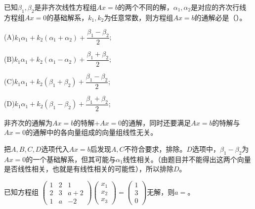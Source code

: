\documentclass[a4paper]{report}
\begin{document}
\EX 已知$\beta_1,\beta_2$是非齐次线性方程组$Ax=b$的两个不同的解，$\alpha_1,\alpha_2$是对应的齐次行线方程组$Ax=0$的基础解系，$k_1,k_2$为任意常数，则方程组$Ax=b$的通解必是（\hphantom{~~~~~~~~~~~~~}）。

(A)$k_1\alpha_1+k_2(\alpha_1+\alpha_2)+\dfrac{\beta_1-\beta_2}{2}$;

(B)$k_1\alpha_1+k_2(\alpha_1-\alpha_2)+\dfrac{\beta_1+\beta_2}{2}$;

(C)$k_1\alpha_1+k_2(\beta_1+\beta_2)+\dfrac{\beta_1-\beta_2}{2}$;

(D)$k_1\alpha_1+k_2(\beta_1-\beta_2)+\dfrac{\beta_1+\beta_2}{2}$;

\begin{jie}
非齐次的通解为$Ax=b$的特解+$Ax=0$的通解，同时还要满足$Ax=b$的特解与$Ax=0$的通解中的各向量组成的向量组线性无关。

把$A,B,C,D$选项代入$Ax=b$后发现$A,C$不符合要求，排除。$D$选项中，$\beta_1-\beta_2$为$Ax=0$的一个基础解系，但其可能与$\alpha_1$线性相关。（由题目并不能得出这两个向量是否线性相关，也就是有线性相关的可能性），所以排除$D$。
\end{jie}

\EX 已知方程组
$
\begin{pmatrix}
1&2&1\\
2&3&a+2\\
1&a&-2
\end{pmatrix}
\begin{pmatrix}
x_1\\ x_2\\ x_3
\end{pmatrix}=
\begin{pmatrix}
1\\ 3\\ 0
\end{pmatrix}
$无解，则$a=$\underline{\hphantom{~~~~~~~~~}}。
\end{document}
